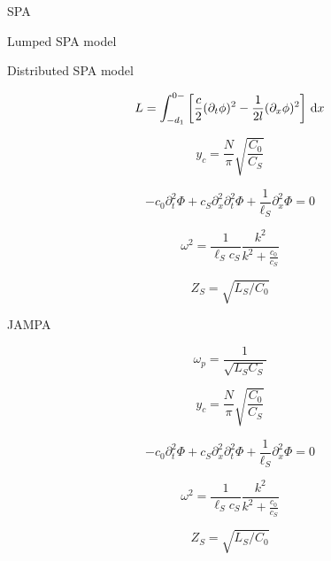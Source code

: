 \begin{section}{SPA}
\begin{subsection}{Lumped SPA model}
\end{subsection}


\begin{subsection}{Distributed SPA model}

\begin{equation}
L = \integral{\left[ \frac{c}{2}(\dt{\phi})^2 - \frac{1}{2l} (\dx{\phi})^2 \right]}{x}{-d_1}{0-}
\end{equation}

\begin{equation}
y_c = \frac{N}{\pi}\sqrt{\frac{C_0}{C_S}}
\end{equation}


\begin{equation}\label{eq:JTL_EOM}
- c_0 \partial_t^2 \Phi + c_S \partial_x^2 \partial_t^2 \Phi + \frac{1}{\ell_S} \partial_x^2 \Phi = 0
\end{equation}


\begin{equation}\label{eq:JTL_dispersion}
\omega^2 = \frac{1}{\ell_S c_S} \frac{k^2}{k^2 + \frac{c_0}{c_S}}
\end{equation}

\begin{equation}\label{eq:Z_JTL}
Z_S = \sqrt{L_S/C_0} 
\end{equation}


\end{subsection}








\begin{subsection}{JAMPA}

\begin{equation}\label{eq:omega_p}
\omega_p = \frac{1}{\sqrt{L_S C_S}}
\end{equation}

\begin{equation}\label{eq:y_c}
y_c = \frac{N}{\pi}\sqrt{\frac{C_0}{C_S}}
\end{equation}


\begin{equation}\label{eq:JTL_EOM}
- c_0 \partial_t^2 \Phi + c_S \partial_x^2 \partial_t^2 \Phi + \frac{1}{\ell_S} \partial_x^2 \Phi = 0
\end{equation}


\begin{equation}\label{eq:JTL_dispersion}
\omega^2 = \frac{1}{\ell_S c_S} \frac{k^2}{k^2 + \frac{c_0}{c_S}}
\end{equation}

\begin{equation}\label{eq:Z_JTL}
Z_S = \sqrt{L_S/C_0} 
\end{equation}


\end{subsection}







\end{section}
